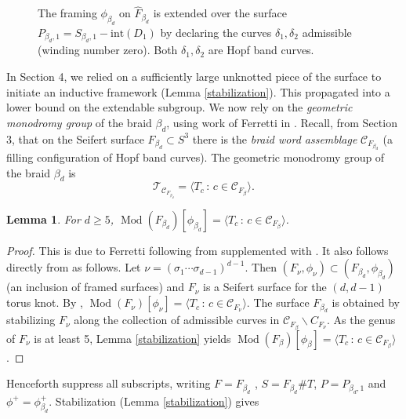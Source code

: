 \documentclass[10pt]{amsart}
\numberwithin{equation}{section}
\theoremstyle{plain}
\newtheorem{lemma}[theorem]{Lemma}
\theoremstyle{definition}
\theoremstyle{remark}
\DeclareMathOperator{\Mod}{Mod}
\begin{document}
\begin{figure}
  \centering
  \def\svgwidth{0.45\columnwidth}
  
  \caption{\textnormal{The framing $\phi_{\beta_d}$ on $\widehat{F}_{\beta_d}$ is extended over the surface $P_{\beta_d,1} = S_{\beta_d,1}-\textrm{int}(D_1)$ by declaring the curves $\delta_1,\delta_2$ admissible (winding number zero). Both $\delta_1,\delta_2$ are Hopf band curves.  }}
  \label{DeltaCurvesThmB}
\end{figure}




In Section 4, we relied on a sufficiently large unknotted piece of the surface to initiate an inductive framework (Lemma \ref{stabilization}). This propagated into a lower bound on the extendable subgroup. We now rely on the \textit{geometric monodromy group} of the braid $\beta_d$, using work of Ferretti in \cite{Ferretti}. Recall, from Section 3, that on the Seifert surface $F_{\beta_d} \subset S^3$ there is the \textit{braid word assemblage} $\mathcal{C}_{F_{\beta_d}}$ (a filling configuration of Hopf band curves). The geometric monodromy group of the braid $\beta_d$ is \[\mathcal{T}_{\mathcal{C}_{F_{\beta_d}}} = \langle T_c \,:\, c\in \mathcal{C}_{F_\beta} \rangle.\] 

\begin{lemma} \label{genframedmcg}
For $d \geq 5$, $\Mod(F_{\beta_d})[\phi_{\beta_d}] = \langle T_c \,:\, c\in \mathcal{C}_{F_\beta} \rangle$. 
\end{lemma}

\begin{proof}
This is due to Ferretti following from \cite[Theorem 2]{Ferretti} supplemented with \cite[Remark 5.1]{Ferretti}. It also follows directly from \cite[Theorem 2]{Ferretti} as follows. Let $\nu = (\sigma_1\cdots\sigma_{d-1})^{d-1}$. Then $(F_\nu,\phi_\nu) \subset (F_{\beta_d},\phi_{\beta_d})$ (an inclusion of framed surfaces) and $F_\nu$ is a Seifert surface for the $(d,d-1)$ torus knot. By \cite[Theorem 2]{Ferretti},  $\Mod(F_{\nu})[\phi_\nu] = \langle T_c \,:\, c \in \mathcal{C}_{F_\nu} \rangle$. The surface $F_{\beta_d}$ is obtained by stabilizing $F_\nu$ along the collection of admissible curves in $\mathcal{C}_{F_\beta} \backslash C_{F_\nu}$. As the genus of $F_\nu$ is at least 5, Lemma \ref{stabilization} yields $\Mod(F_\beta)[\phi_\beta] = \langle T_c \,:\, c\in \mathcal{C}_{F_\beta} \rangle$. 
\end{proof}

Henceforth suppress all subscripts, writing $F = F_{\beta_d}$ , $S = F_{\beta_d}\# T$, $P = P_{\beta_d,1}$ and $\phi^+ = \phi^+_{\beta_d}$. Stabilization (Lemma \ref{stabilization}) gives 
\end{document}
